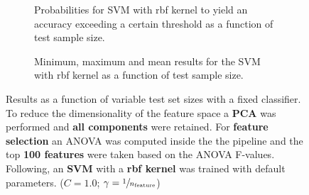 \begin{figure}
    \captionsetup[subfigure]{justification=justified,singlelinecheck=false}
    \begin{subfigure}[t]{0.61\textwidth}
        
        \caption{Probabilities for SVM with rbf kernel to yield an accuracy exceeding a certain threshold as a function of test sample size.}
    \end{subfigure}
    \hspace{3.0mm}
    \begin{subfigure}[t]{0.34\textwidth}
        
        \caption{Minimum, maximum and mean results for the SVM with rbf kernel as a function of test sample size.}
    \end{subfigure}
    \caption[Effects of varying test sample size. SVM (kernel = rbf); Preprocessing: PCA ($n_\text{components} = \text{all}$); ANOVA feature selection ($k_\text{best} = \num{100}$)]{Results as a function of variable test set sizes with a fixed classifier. To reduce the dimensionality of the feature space a \textbf{PCA} was performed and \textbf{all components} were retained. For \textbf{feature selection} an ANOVA was computed inside the the pipeline and the top \textbf{\num{100} features} were taken based on the ANOVA F-values. Following, an \textbf{{SVM}} with a \textbf{{rbf kernel}} was trained with default parameters. ($C=\num{1.0}$; $\gamma=\sfrac{1}{n_\text{feature}}$)}
    \label{fig:PCA_all_components_100_best_selected_SVC}
\end{figure}

